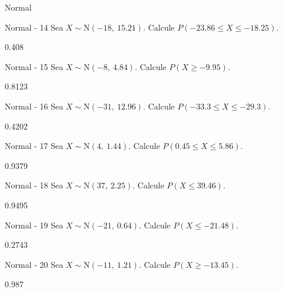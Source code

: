 \documentclass[a4,11pt]{aleph-notas}
\newcommand{\Norm}{\text{N}}
\begin{document}
\begin{quiz}{Normal}
\begin{numerical}[tolerance=0.001]%
    {Normal - 14}
    Sea \( X \sim \Norm(-18,\ 15.21) \). Calcule \( P(-23.86 \leq X \leq -18.25) \).
    \item[] 0.408
\end{numerical}

\begin{numerical}[tolerance=0.001]%
    {Normal - 15}
    Sea \( X \sim \Norm(-8,\ 4.84) \). Calcule \( P(X \geq -9.95) \).
    \item[] 0.8123
\end{numerical}

\begin{numerical}[tolerance=0.001]%
    {Normal - 16}
    Sea \( X \sim \Norm(-31,\ 12.96) \). Calcule \( P(-33.3 \leq X \leq -29.3) \).
    \item[] 0.4202
\end{numerical}

\begin{numerical}[tolerance=0.001]%
    {Normal - 17}
    Sea \( X \sim \Norm(4,\ 1.44) \). Calcule \( P(0.45 \leq X \leq 5.86) \).
    \item[] 0.9379
\end{numerical}

\begin{numerical}[tolerance=0.001]%
    {Normal - 18}
    Sea \( X \sim \Norm(37,\ 2.25) \). Calcule \( P(X \leq 39.46) \).
    \item[] 0.9495
\end{numerical}

\begin{numerical}[tolerance=0.001]%
    {Normal - 19}
    Sea \( X \sim \Norm(-21,\ 0.64) \). Calcule \( P(X \leq -21.48) \).
    \item[] 0.2743
\end{numerical}

\begin{numerical}[tolerance=0.001]%
    {Normal - 20}
    Sea \( X \sim \Norm(-11,\ 1.21) \). Calcule \( P(X \geq -13.45) \).
    \item[] 0.987
\end{numerical}


\end{quiz}
\end{document}
